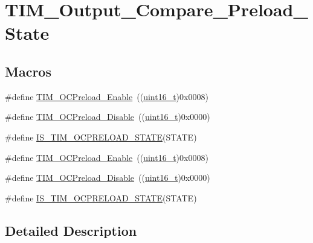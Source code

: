 \hypertarget{group___t_i_m___output___compare___preload___state}{}\section{T\+I\+M\+\_\+\+Output\+\_\+\+Compare\+\_\+\+Preload\+\_\+\+State}
\label{group___t_i_m___output___compare___preload___state}
\subsection*{Macros}
\begin{DoxyCompactItemize}
\item 
\#define \hyperlink{group___t_i_m___output___compare___preload___state_gad647db2e7a89bd6db3c787680afccf8f}{T\+I\+M\+\_\+\+O\+C\+Preload\+\_\+\+Enable}~((\hyperlink{_p_e___types_8h_a1f1825b69244eb3ad2c7165ddc99c956}{uint16\+\_\+t})0x0008)
\item 
\#define \hyperlink{group___t_i_m___output___compare___preload___state_ga0cbcc3c4d90d61d85550db2173737ed6}{T\+I\+M\+\_\+\+O\+C\+Preload\+\_\+\+Disable}~((\hyperlink{_p_e___types_8h_a1f1825b69244eb3ad2c7165ddc99c956}{uint16\+\_\+t})0x0000)
\item 
\#define \hyperlink{group___t_i_m___output___compare___preload___state_ga48cc07c5e87b5fd7549b7668f1598ab5}{I\+S\+\_\+\+T\+I\+M\+\_\+\+O\+C\+P\+R\+E\+L\+O\+A\+D\+\_\+\+S\+T\+A\+TE}(S\+T\+A\+TE)
\item 
\#define \hyperlink{group___t_i_m___output___compare___preload___state_gad647db2e7a89bd6db3c787680afccf8f}{T\+I\+M\+\_\+\+O\+C\+Preload\+\_\+\+Enable}~((\hyperlink{_p_e___types_8h_a1f1825b69244eb3ad2c7165ddc99c956}{uint16\+\_\+t})0x0008)
\item 
\#define \hyperlink{group___t_i_m___output___compare___preload___state_ga0cbcc3c4d90d61d85550db2173737ed6}{T\+I\+M\+\_\+\+O\+C\+Preload\+\_\+\+Disable}~((\hyperlink{_p_e___types_8h_a1f1825b69244eb3ad2c7165ddc99c956}{uint16\+\_\+t})0x0000)
\item 
\#define \hyperlink{group___t_i_m___output___compare___preload___state_ga48cc07c5e87b5fd7549b7668f1598ab5}{I\+S\+\_\+\+T\+I\+M\+\_\+\+O\+C\+P\+R\+E\+L\+O\+A\+D\+\_\+\+S\+T\+A\+TE}(S\+T\+A\+TE)
\end{DoxyCompactItemize}


\subsection{Detailed Description}


